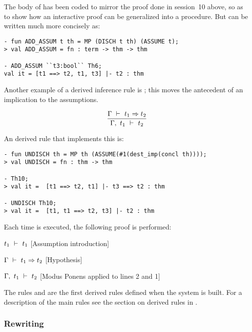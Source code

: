 \noindent The body of  has been coded  to mirror  the proof done
in session~10 above, so as to show how an interactive proof can be
generalized into a procedure.  But  can be written much
more concisely as:

\begin{session}\begin{verbatim}
- fun ADD_ASSUM t th = MP (DISCH t th) (ASSUME t);
> val ADD_ASSUM = fn : term -> thm -> thm

- ADD_ASSUM ``t3:bool`` Th6;
val it = [t1 ==> t2, t1, t3] |- t2 : thm
\end{verbatim}\end{session}


    Another example of a derived inference rule is ; this
    moves the antecedent of an implication to the assumptions.

\[ \frac{\Gamma\turn t_1\imp t_2}{\Gamma,\ t_1\turn t_2} \]

\noindent An \ML{} derived rule that implements this is:


\begin{session}\begin{verbatim}
- fun UNDISCH th = MP th (ASSUME(#1(dest_imp(concl th))));
> val UNDISCH = fn : thm -> thm

- Th10;
> val it =  [t1 ==> t2, t1] |- t3 ==> t2 : thm

- UNDISCH Th10;
> val it =  [t1, t1 ==> t2, t3] |- t2 : thm
\end{verbatim}\end{session}

\noindent Each time  is executed,
the following proof is performed:

\begin{proofenumerate}
\item $ t_1\ \vdash\  t_1$ \hfill [Assumption introduction]
\item $ \Gamma\ \vdash\  t_1\Rightarrow t_2$ \hfill [Hypothesis]
\item $ \Gamma,\ t_1\ \vdash\  t_2$ \hfill [Modus Ponens applied to lines 2 and 1]
\end{proofenumerate}

The rules  and  are the first derived rules
defined when the \HOL{} system is built. For a description of the main
rules see the section on derived rules in \DESCRIPTION.

\subsubsection{Rewriting}

